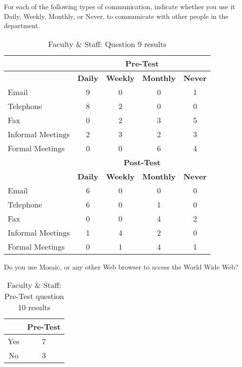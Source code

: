 \begin{table}[htb] 
\caption{Faculty \& Staff: Question 9 results}
{For each of the following types of communication, indicate whether
  you use it Daily, Weekly, Monthly, or Never, to communicate with other
  people in the department.}
\begin{center}
\begin{tabular}{|l|c|c|c|c|} \hline
 & \multicolumn{4}{|c|}{\bf Pre-Test} \\ \hline 
 & {\bf Daily} & {\bf Weekly} & {\bf Monthly} & {\bf Never} \\ \hline
 {Email}            & 9 & 0 & 0 & 1 \\ \hline 
 {Telephone}        & 8 & 2 & 0 & 0 \\ \hline 
 {Fax}              & 0 & 2 & 3 & 5 \\ \hline 
 {Informal Meetings}& 2 & 3 & 2 & 3 \\ \hline 
 {Formal Meetings}  & 0 & 0 & 6 & 4 \\ \hline \hline
 & \multicolumn{4}{|c|}{\bf Post-Test} \\ \hline 
 & {\bf Daily} & {\bf Weekly} & {\bf Monthly} & {\bf Never} \\ \hline
 {Email}            & 6 & 0 & 0 & 0 \\ \hline 
 {Telephone}        & 6 & 0 & 1 & 0 \\ \hline 
 {Fax}              & 0 & 0 & 4 & 2 \\ \hline 
 {Informal Meetings}& 1 & 4 & 2 & 0 \\ \hline 
 {Formal Meetings}  & 0 & 1 & 4 & 1 \\ \hline 
\end{tabular}
\end{center}
\label{tab:question9a}
\end{table}

\begin{table}[htb]
\caption{Faculty \& Staff: Pre-Test question 10 results}
{Do you use Mosaic, or any other Web browser to access the World Wide
  Web?}
\begin{center}
\begin{tabular}{|c|c|} \hline
  & {\bf Pre-Test} \\ \hline 
 Yes & 7 \\ \hline 
 No  & 3 \\ \hline 
\end{tabular}
\end{center}
\label{tab:Prequestion10a}
\end{table}

